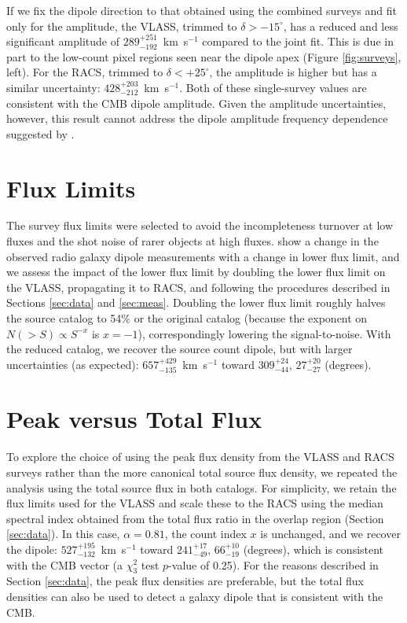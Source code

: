 \documentclass[twocolumn]{aastex63}
\begin{document}
If we fix the dipole direction to that obtained using the combined surveys and fit only for the amplitude, the VLASS, trimmed to
$\delta > -15^\circ$, has a reduced and less significant amplitude of $289^{+251}_{-192}$~km~s$^{-1}$ compared to the joint fit.
This is due in part to the low-count pixel regions seen near the dipole apex (Figure \ref{fig:surveys}, left).  For the RACS,
trimmed to $\delta < +25^\circ$, the amplitude is higher but has a similar uncertainty:   $428^{+203}_{-212}$~km~s$^{-1}$.
Both of these single-survey values are consistent with the CMB dipole amplitude.  
Given the amplitude uncertainties, however, this result cannot address the dipole amplitude frequency dependence
suggested by \citet{siewert2021}.  


\section{Flux Limits}

The survey flux limits were selected to avoid the incompleteness turnover at low fluxes and the shot noise of rarer objects
at high fluxes.  \citet{blake2002} show a change in the observed radio galaxy dipole measurements with a change in lower flux
limit, and we assess the impact of the lower flux limit by doubling the lower flux limit on the VLASS, propagating it to RACS,
and following the procedures described in Sections \ref{sec:data} and \ref{sec:meas}.  Doubling the lower flux limit roughly halves the
source catalog to 54\% or the original catalog
(because the exponent on $N(>S)\propto S^{-x}$ is $x=-1$), correspondingly lowering the signal-to-noise.
With the reduced catalog, we recover the source count dipole, but with larger uncertainties (as expected):
$657^{+429}_{-135}$~km~s$^{-1}$ toward $309^{+24}_{-44}$, $27^{+20}_{-27}$ (degrees).

 
\section{Peak versus Total Flux}

To explore the choice of using the peak flux density from the VLASS and RACS surveys rather than the more canonical total source flux density, we repeated the analysis using the total source flux in both catalogs.  For simplicity, we retain the flux limits used for the VLASS
and scale these to the RACS using the median spectral index obtained from the total flux ratio in the overlap region (Section \ref{sec:data}).
In this case, $\alpha = 0.81$, the count index $x$ is unchanged, and we recover the dipole:  $527^{+195}_{-132}$~km~s$^{-1}$ toward $241^{+17}_{-49}$, $66^{+10}_{-19}$ (degrees),  which is consistent with the
  CMB vector (a $\chi^2_3$ test $p$-value of 0.25).
For the reasons described in Section \ref{sec:data}, the peak flux densities are preferable, but the total flux densities can also be used to detect a galaxy dipole that is consistent with the CMB.
\end{document}
